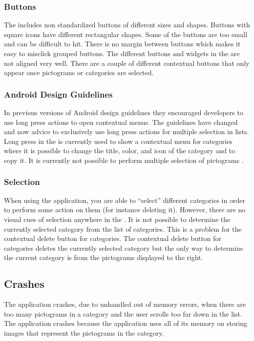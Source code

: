 \subsubsection{Buttons}

The \ct includes non standardized buttons of different sizes and shapes. Buttons with square icons have different rectangular shapes. Some of the buttons are too small and can be difficult to hit. There is no margin between buttons which makes it easy to misclick grouped buttons. The different buttons and widgets in the \ct are not aligned very well. There are a couple of different contextual buttons that only appear once pictograms or categories are selected. 

\subsubsection{Android Design Guidelines}

In previous versions of Android design guidelines they encouraged developers to use long press actions to open contextual menus. The guidelines have changed and now advice to exclusively use long press actions for multiple selection in lists. Long press in the \ct is currently used to show a contextual menu for categories where it is possible to change the title, color, and icon of the category and to copy it. It is currently not possible to perform multiple selection of pictograms \parencite{android_guidelines_longpress}.

\subsubsection{Selection}

When using the application, you are able to ``select'' different categories in order to perform some action on them (for instance deleting it). However, there are no visual cues of selection anywhere in the \ct.  It is not possible to determine the currently selected category from the list of categories. This is a problem for the contextual delete button for categories. The contextual delete button for categories deletes the currently selected category but the only way to determine the current category is from the pictograms displayed to the right.

\subsection{Crashes}
The application crashes, due to unhandled out of memory errors, when there are too many pictograms in a category and the user scrolls too far down in the list. The application crashes because the application uses all of its memory on storing images that represent the pictograms in the category. 

